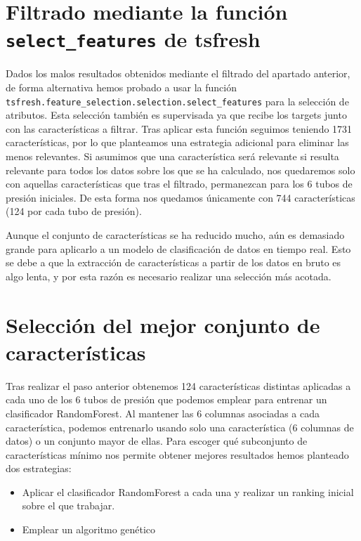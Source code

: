 \documentclass[a4paper,12pt,twoside,oldfontcommands]{memoir}
\begin{document}
\section{Filtrado mediante la función \texttt{select\_features} de tsfresh}
Dados los malos resultados obtenidos mediante el filtrado del apartado anterior, de forma alternativa hemos probado a usar la función
\texttt{tsfresh.feature\_selection.selection.select\_features} para la selección de atributos. Esta selección también es supervisada ya que recibe los targets junto con las características a filtrar. Tras aplicar esta función seguimos teniendo 1731 características, por lo que planteamos una estrategia adicional para eliminar las menos relevantes. Si asumimos que una característica será relevante si resulta relevante para todos los datos sobre los que se ha calculado, nos quedaremos solo con aquellas características que tras el filtrado, permanezcan para los 6 tubos de presión iniciales. De esta forma nos quedamos únicamente con 744 características (124 por cada tubo de presión). 

Aunque el conjunto de características se ha reducido mucho, aún es demasiado grande para aplicarlo a un modelo de clasificación de datos en tiempo real. Esto se debe a que la extracción de características a partir de los datos en bruto es algo lenta, y por esta razón es necesario realizar una selección más acotada.

\section{Selección del mejor conjunto de características}

Tras realizar el paso anterior obtenemos 124 características distintas aplicadas a cada uno de los 6 tubos de presión que podemos emplear para entrenar un clasificador RandomForest. Al mantener las 6 columnas asociadas a cada característica, podemos entrenarlo usando solo una característica (6 columnas de datos) o un conjunto mayor de ellas. Para escoger qué subconjunto de características mínimo nos permite obtener mejores resultados hemos planteado dos estrategias: 

\begin{itemize}
    \item Aplicar el clasificador RandomForest a cada una y realizar un ranking inicial sobre el que trabajar. 
    \item Emplear un algoritmo genético
\end{itemize}
\end{document}
